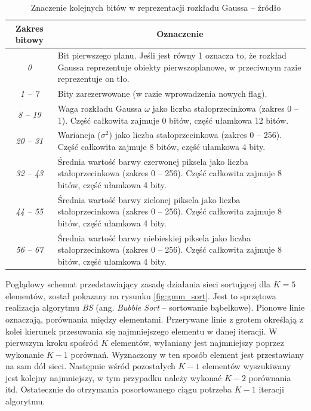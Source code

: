 	\begin{table}[h]
		\centering
		\begin{threeparttable}
			\caption{Znaczenie kolejnych bitów w reprezentacji rozkładu Gaussa -- źródło \cite{piszczek_15}}
			\label{tab:gmm_ram_model}
	
			\begin{tabular}{| c | m{12.5cm} |}  
			\hline
			\textbf{Zakres bitowy} & \multicolumn{1}{c|}{\textbf{Oznaczenie}} \\
			\hline
			\textit{0} & Bit pierwszego planu. Jeśli jest równy 1 oznacza to, że rozkład Gaussa reprezentuje obiekty pierwszoplanowe, w przeciwnym razie reprezentuje on tło. \\
			\hline
			\textit{1 -- 7} & Bity zarezerwowane (w razie wprowadzenia nowych flag). \\
			\hline
	        \textit{8 -- 19} & Waga rozkładu Gaussa $\omega$ jako liczba stałoprzecinkowa (zakres 0 -- 1). Część całkowita zajmuje 0 bitów, część ułamkowa 12 bitów. \\
		    \hline
		    \textit{20 -- 31} & Wariancja ($\sigma^2$) jako liczba stałoprzecinkowa (zakres 0 -- 256). Część całkowita zajmuje 8 bitów, część ułamkowa 4 bity. \\
		    \hline
		    \textit{32 -- 43} & Średnia wartość barwy czerwonej piksela jako liczba stałoprzecinkowa (zakres 0 -- 256). Część całkowita zajmuje 8 bitów, część ułamkowa 4 bity. \\
	        \hline
	        \textit{44 -- 55} & Średnia wartość barwy zielonej piksela jako liczba stałoprzecinkowa (zakres 0 -- 256). Część całkowita zajmuje 8 bitów, część ułamkowa 4 bity. \\
	        \hline
	        \textit{56 -- 67} & Średnia wartość barwy niebieskiej piksela jako liczba stałoprzecinkowa (zakres 0 -- 256). Część całkowita zajmuje 8 bitów, część ułamkowa 4 bity. \\
	        \hline
			\end{tabular}				
		\end{threeparttable}
	\end{table}

Poglądowy schemat przedstawiający zasadę działania sieci sortującej dla $K=5$ elementów, został pokazany na rysunku \ref{fig:gmm_sort}. Jest to sprzętowa realizacja algorytmu \textit{BS} (ang. \textit{Bubble Sort} -- sortowanie bąbelkowe). Pionowe linie oznaczają, porównania między elementami. Przerywane linie z grotem określają z kolei kierunek przesuwania się najmniejszego elementu w danej iteracji. W pierwszym kroku spośród $K$ elementów, wyłaniany jest najmniejszy poprzez wykonanie $K-1$ porównań. Wyznaczony w ten sposób element jest przestawiany na sam dół sieci. Następnie wśród pozostałych $K-1$ elementów wyszukiwany jest kolejny najmniejszy, w tym przypadku należy wykonać $K-2$ porównania itd. Ostatecznie do otrzymania posortowanego ciągu potrzeba $K-1$ iteracji algorytmu.  
	

